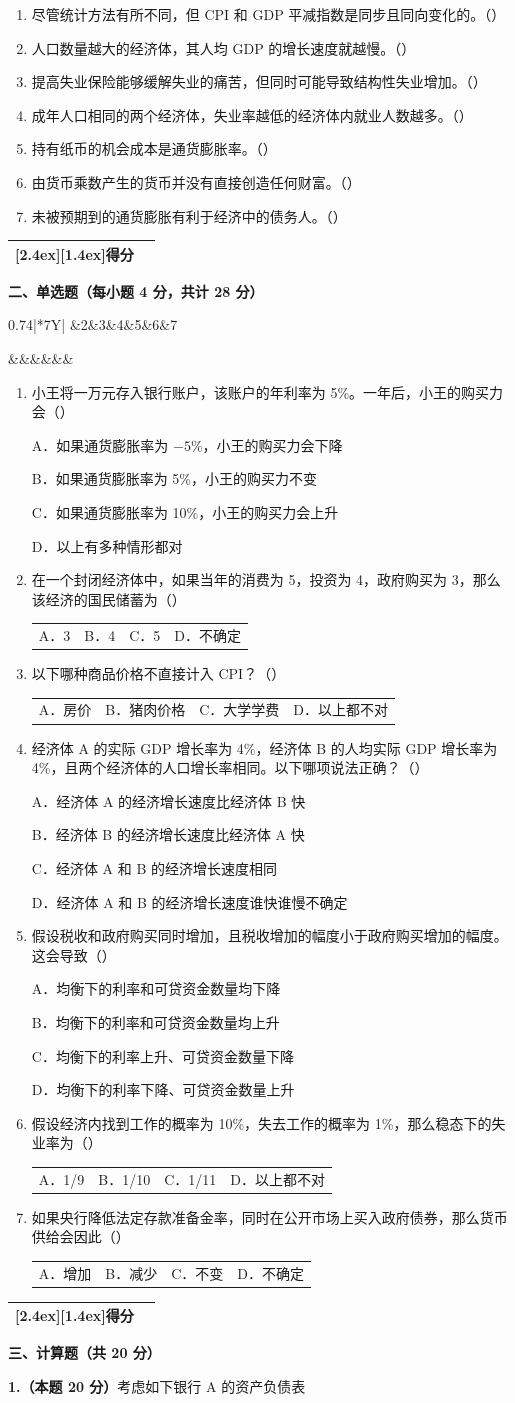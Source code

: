 \documentclass[UTF8,11pt,a4paper,fontset=fandol]{ctexart}
\makeatletter
\newcommand{\scoretitle}[1]{%
  \noindent\begin{tabular}{|c|c|}\hline
  \raisebox{0pt}[2.4ex][1.4ex]{\bfseries 得分} & \makebox[1.15cm]{} \\ \hline
  \end{tabular}\hspace{1em}\textbf{#1}\par\vspace{0.6em}}
\newcommand{\mcgrid}{%
  \begin{center}\begin{tabularx}{0.74\linewidth}{|*{7}{Y|}}
  \hline 1&2&3&4&5&6&7 \\ \hline
  \rule{0pt}{2.25em} &&&&&& \\ \hline
  \end{tabularx}\end{center}}
\newcommand{\tfitem}[1]{\item #1\nobreak\hfill（\qquad）}
\newcommand{\fourchoices}[4]{%
  \par\nopagebreak\begin{tabularx}{\linewidth}{@{}XXXX@{}}
  A．#1 & B．#2 & C．#3 & D．#4
  \end{tabularx}\par}
\newcommand{\choice}[1]{\par\nopagebreak #1}
\makeatother
\begin{document}
\begin{enumerate}[label=\arabic*.,start=4,leftmargin=*,itemsep=2.2em,topsep=0.6em]
\tfitem{尽管统计方法有所不同，但 CPI 和 GDP 平减指数是同步且同向变化的。}
\tfitem{人口数量越大的经济体，其人均 GDP 的增长速度就越慢。}
\tfitem{提高失业保险能够缓解失业的痛苦，但同时可能导致结构性失业增加。}
\tfitem{成年人口相同的两个经济体，失业率越低的经济体内就业人数越多。}
\tfitem{持有纸币的机会成本是通货膨胀率。}
\tfitem{由货币乘数产生的货币并没有直接创造任何财富。}
\tfitem{未被预期到的通货膨胀有利于经济中的债务人。}
\end{enumerate}
\newpage
\scoretitle{二、单选题（每小题 4 分，共计 28 分）}
\mcgrid
\begin{enumerate}[label=\arabic*.,leftmargin=*,itemsep=0.55em,topsep=0em]
\item 小王将一万元存入银行账户，该账户的年利率为 5\%。一年后，小王的购买力会（\qquad）
\choice{A．如果通货膨胀率为 $-5\%$，小王的购买力会下降}
\choice{B．如果通货膨胀率为 5\%，小王的购买力不变}
\choice{C．如果通货膨胀率为 10\%，小王的购买力会上升}
\choice{D．以上有多种情形都对}
\item 在一个封闭经济体中，如果当年的消费为 5，投资为 4，政府购买为 3，那么该经济的国民储蓄为（\qquad）
\fourchoices{3}{4}{5}{不确定}
\item 以下哪种商品价格不直接计入 CPI？（\qquad）
\fourchoices{房价}{猪肉价格}{大学学费}{以上都不对}
\item 经济体 A 的实际 GDP 增长率为 4\%，经济体 B 的人均实际 GDP 增长率为 4\%，且两个经济体的人口增长率相同。以下哪项说法正确？（\qquad）
\choice{A．经济体 A 的经济增长速度比经济体 B 快}
\choice{B．经济体 B 的经济增长速度比经济体 A 快}
\choice{C．经济体 A 和 B 的经济增长速度相同}
\choice{D．经济体 A 和 B 的经济增长速度谁快谁慢不确定}
\item 假设税收和政府购买同时增加，且税收增加的幅度小于政府购买增加的幅度。这会导致（\qquad）
\choice{A．均衡下的利率和可贷资金数量均下降}
\choice{B．均衡下的利率和可贷资金数量均上升}
\choice{C．均衡下的利率上升、可贷资金数量下降}
\choice{D．均衡下的利率下降、可贷资金数量上升}
\item 假设经济内找到工作的概率为 10\%，失去工作的概率为 1\%，那么稳态下的失业率为（\qquad）
\fourchoices{1/9}{1/10}{1/11}{以上都不对}
\item 如果央行降低法定存款准备金率，同时在公开市场上买入政府债券，那么货币供给会因此（\qquad）
\fourchoices{增加}{减少}{不变}{不确定}
\end{enumerate}
\newpage
\scoretitle{三、计算题（共 20 分）}
\textbf{1.（本题 20 分）}考虑如下银行 A 的资产负债表
\end{document}
